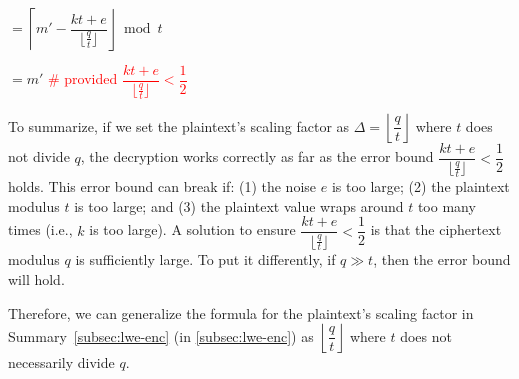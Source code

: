$= \left\lceil m'  - \dfrac{kt + e}{\lfloor\frac{q}{t}\rfloor} \right\rfloor \bmod t$

$= m'$  \textcolor{red}{ \# provided $\dfrac{kt + e}{\lfloor\frac{q}{t}\rfloor} < \dfrac{1}{2}$}

To summarize, if we set the plaintext's scaling factor as $\Delta=\left\lfloor\dfrac{q}{t}\right\rfloor$ where $t$ does not divide $q$, the decryption works correctly as far as the error bound $\dfrac{kt + e}{\lfloor\frac{q}{t}\rfloor} < \dfrac{1}{2}$ holds. This error bound can break if: (1) the noise $e$ is too large; (2) the plaintext modulus $t$ is too large; and (3) the plaintext value wraps around $t$ too many times (i.e., $k$ is too large). A solution to ensure $\dfrac{kt + e}{\lfloor\frac{q}{t}\rfloor} < \dfrac{1}{2}$ is that the ciphertext modulus $q$ is sufficiently large. To put it differently, if $q \gg t$, then the error bound will hold. 

Therefore, we can generalize the formula for the plaintext's scaling factor in Summary~\ref*{subsec:lwe-enc} (in \autoref{subsec:lwe-enc}) as $\left\lfloor\dfrac{q}{t}\right\rfloor$ where $t$ does not necessarily divide $q$. 


